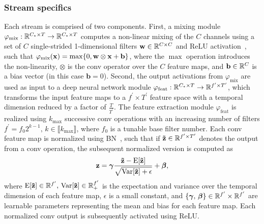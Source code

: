 \subsubsection{Stream specifics}
Each stream is comprised of two components.
First, a mixing module \( \varphi_\text{mix} : \mathbb{R}^{C_{\ast} \times T} \rightarrow \mathbb{R}^{C_{\ast} \times T} \) computes a non-linear mixing of the \(C\) channels using a set of \(C\) single-strided 1-dimensional filters \(\mathbf{w} \in \mathbb{R}^{C \times C}\) and \ac{ReLU} activation~\cite{Nair2010}, such that \(\func{\varphi_\text{mix}}{\mathbf{x}} = \max \braces*{0, \mathbf{w} \otimes \mathbf{x} + \mathbf{b}}\), where the \(\max\) operation introduces the non-linearity, \(\otimes\) is the conv operator over the \(C\) feature maps, and \(\mathbf{b}\in \mathbb{R}^{C}\) is a bias vector (in this case \(\mathbf{b} = 0\)).
Second, the output activations from \(\varphi_\text{mix}\) are used as input to a deep neural network module \(\varphi_\text{feat} : \mathbb{R}^{C_\ast \times T} \rightarrow \mathbb{R}^{f^{\prime} \times T^{\prime}}\), which transforms the input feature maps to a \(f^{\prime} \times T^{\prime}\) feature space with a temporal dimension reduced by a factor of \(\frac{T}{T^{\prime}}\).
The feature extraction module \(\varphi_\text{feat}\) is realized using \(k_\text{max}\) successive conv operations with an increasing number of filters \(f^{\prime} = f_0 2^{k-1}, \, k \in \llbracket k_\text{max} \rrbracket\), where \(f_0\) is a tunable base filter number.
Each conv feature map is normalized using \ac{BN}~\cite{Ioffe2015}, such that if \(\mathbf{\tilde{z}} \in \mathbb{R}^{f^{\prime} \times T^{\prime}}\) denotes the output from a conv operation, the subsequent normalized version is computed as
\begin{equation}
    \mathbf{z} = \boldsymbol{\gamma}\frac{\mathbf{\tilde{z}} - \expect{\mathbf{\tilde{z}}}}{ \sqrt{\variance{\mathbf{\tilde{z}}} + \epsilon}} + \boldsymbol{\beta},
\end{equation}
where \(\expect{\mathbf{\tilde{z}}} \in \R{f^{\prime}}, \, \variance{\mathbf{\tilde{z}}} \in \R{f^{\prime}}_+\) is the expectation and variance over the temporal dimension of each feature map, \(\epsilon\) is a small constant, and \(\braces*{\boldsymbol{\gamma}, \, \boldsymbol{\beta}} \in \R{f^{\prime}} \times \R{f^{\prime}}\) are learnable parameters representing the mean and bias for each feature map.
Each normalized conv output is subsequently activated using \ac{ReLU}.

